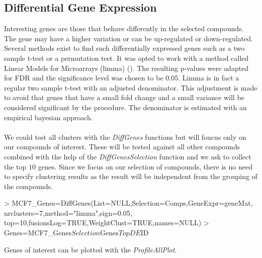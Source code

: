 \documentclass[a4paper]{article}
\begin{document}
\subsection{Differential Gene Expression}
Interesting genes are those that behave differently in the selected compounds.
The gene may have a higher variation or can be up-regulated or down-regulated.
Several methods exist to find such differentially expressed genes such as a two
sample t-test or a permutation test. It was opted to work with a method called
Linear Models for Microarrays (limma) (\cite{Smyth2004}). The resulting p-values
were adapted for FDR and the significance level was chosen to be 0.05. Limma is
in fact a regular two sample t-test with an adjusted denominator. This
adjustment is made to avoid that genes that have a small fold change and a small
variance will be considered significant by the procedure. The denominator is
estimated with an empirical bayesian approach.\\ \\
We could test all clusters with the {\it DiffGenes} functions but will foucus
only on our compounds of interest. These will be tested against all other
compounds combined with the help of the {\it DiffGenesSelection} function and we
ask to collect the top $10$ genes. Since we focus on our selection of compounds,
there is no need to specify clustering results as the result will be independent
from the grouping of the compounds.
\begin{Schunk}
\begin{Sinput}
> MCF7_Genes=DiffGenes(List=NULL,Selection=Comps,GeneExpr=geneMat,
 		             nrclusters=7,method="limma",sign=0.05,
                      top=10,fusionsLog=TRUE,WeightClust=TRUE,names=NULL)
> Genes=MCF7_Genes$Selection$Genes$TopDE$ID				  
\end{Sinput}
\end{Schunk}
Genes of interest can be plotted with the {\it ProfileAllPlot}.
\vspace{-0.3cm}
\end{document}
